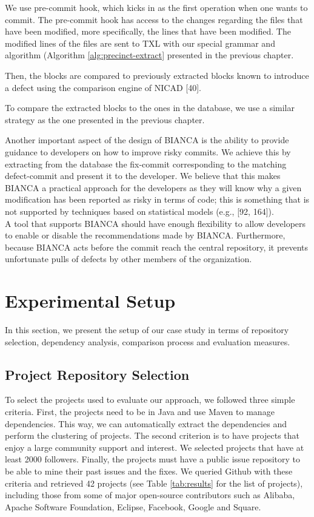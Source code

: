 \documentclass[12pt]{report}
\begin{document}
We use pre-commit hook, which kicks in as the first operation when one
wants to commit. The pre-commit hook has access to the changes regarding
the files that have been modified, more specifically, the lines that
have been modified. The modified lines of the files are sent to TXL with
our special grammar and algorithm (Algorithm \ref{alg:precinct-extract}
presented in the previous chapter.

Then, the blocks are compared to previously extracted blocks known to
introduce a defect using the comparison engine of NICAD {[}40{]}.

To compare the extracted blocks to the ones in the database, we use a
similar strategy as the one presented in the previous chapter.

Another important aspect of the design of BIANCA is the ability to
provide guidance to developers on how to improve risky commits. We
achieve this by extracting from the database the fix-commit
corresponding to the matching defect-commit and present it to the
developer. We believe that this makes BIANCA a practical approach for
the developers as they will know why a given modification has been
reported as risky in terms of code; this is something that is not
supported by techniques based on statistical models (e.g., {[}92,
164{]}).\\
A tool that supports BIANCA should have enough flexibility to allow
developers to enable or disable the recommendations made by BIANCA.
Furthermore, because BIANCA acts before the commit reach the central
repository, it prevents unfortunate pulls of defects by other members of
the organization.

\section{Experimental Setup}\label{experimental-setup-2}

In this section, we present the setup of our case study in terms of
repository selection, dependency analysis, comparison process and
evaluation measures.

\subsection{Project Repository Selection}\label{sec:rep}

To select the projects used to evaluate our approach, we followed three
simple criteria. First, the projects need to be in Java and use Maven to
manage dependencies. This way, we can automatically extract the
dependencies and perform the clustering of projects. The second
criterion is to have projects that enjoy a large community support and
interest. We selected projects that have at least 2000 followers.
Finally, the projects must have a public issue repository to be able to
mine their past issues and the fixes. We queried Github with these
criteria and retrieved 42 projects (see Table \ref{tab:results} for the
list of projects), including those from some of major open-source
contributors such as Alibaba, Apache Software Foundation, Eclipse,
Facebook, Google and Square.
\end{document}
